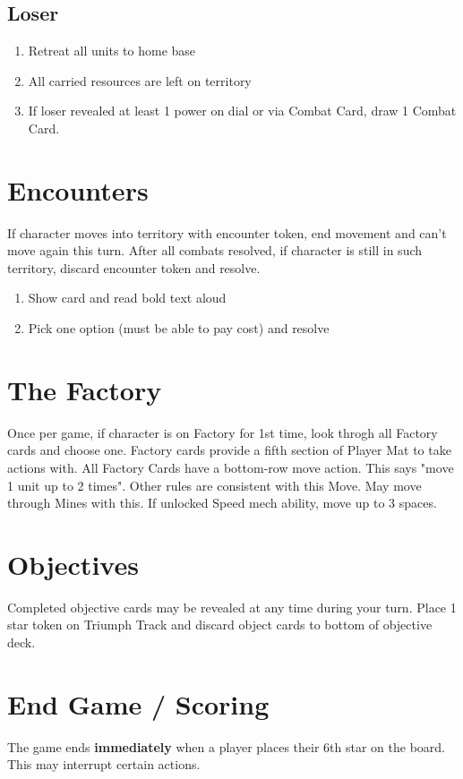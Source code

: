 \documentclass[12pt]{article}
\newenvironment{enumerateCustom}
{\begin{enumerate}
  \setlength{\itemsep}{1pt}
  \setlength{\parskip}{0pt}
  \setlength{\parsep}{0pt}}
{\end{enumerate}}
\begin{document}
\begin{multicols*}{2}
\subsection*{Loser}
\begin{enumerateCustom}
    \item Retreat all units to home base
    \item All carried resources are left on territory
    \item If loser revealed at least 1 power on dial or via Combat Card, draw 1 Combat Card.
\end{enumerateCustom}

\section*{Encounters}
If character moves into territory with encounter token, end movement and can't move again this turn. After all combats resolved, if character is still in such territory, discard encounter token and resolve.

\begin{enumerateCustom}
    \item Show card and read bold text aloud
    \item Pick one option (must be able to pay cost) and resolve
\end{enumerateCustom}

\section*{The Factory}
Once per game, if character is on Factory for 1st time, look throgh all Factory cards and choose one. Factory cards provide a fifth section of Player Mat to take actions with. All Factory Cards have a bottom-row move action. This says "move 1 unit up to 2 times". Other rules are consistent with this Move. May move through Mines with this. If unlocked Speed mech ability, move up to 3 spaces.

\section*{Objectives}
Completed objective cards may be revealed at any time during your turn. Place 1 star token on Triumph Track and discard object cards to bottom of objective deck.

\section*{End Game / Scoring}
The game ends \textbf{immediately} when a player places their 6th star on the board. This may interrupt certain actions.


\end{multicols*}
\end{document}
